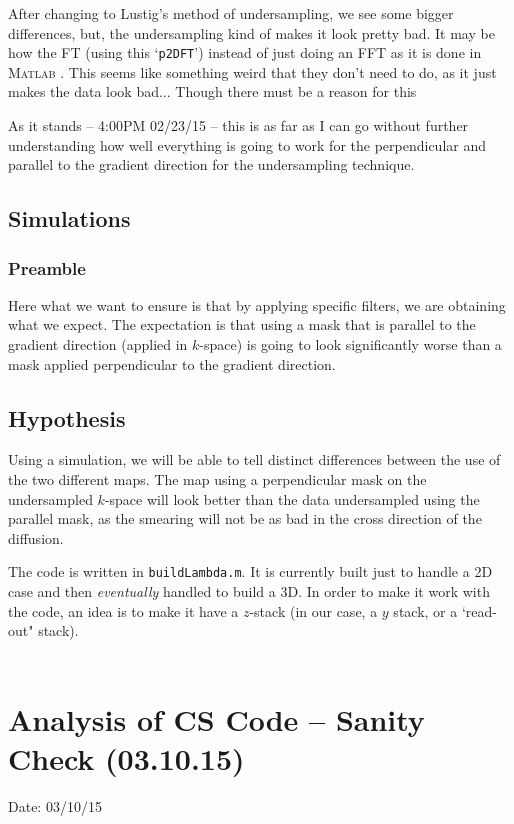 \documentclass[11 pt]{article}
\newcommand{\matlab}{\textsc{Matlab }}
\let\oldsection\section
\renewcommand\section{\clearpage\newpage\oldsection}
\begin{document}
        After changing to Lustig's method of undersampling, we see some bigger differences, but, the undersampling kind of makes it look pretty bad. It may be how the FT (using this `\verb!p2DFT!') instead of just doing an FFT as it is done in \matlab. This seems like something weird that they don't need to do, as it just makes the data look bad... Though there must be a reason for this

        As it stands -- 4:00PM 02/23/15 -- this is as far as I can go without further understanding how well everything is going to work for the perpendicular and parallel to the gradient direction for the undersampling technique.

    \subsection{Simulations}

      \subsubsection{Preamble}

        Here what we want to ensure is that by applying specific filters, we are obtaining what we expect. The expectation is that using a mask that is parallel to the gradient direction (applied in $k$-space) is going to look significantly worse than a mask applied perpendicular to the gradient direction.

    \subsection{Hypothesis}
      Using a simulation, we will be able to tell distinct differences between the use of the two different maps. The map using a perpendicular mask on the undersampled $k$-space will look better than the data undersampled using the parallel mask, as the smearing will not be as bad in the cross direction of the diffusion.

      The code is written in \verb!buildLambda.m!. It is currently built just to handle a 2D case and then \emph{eventually} handled to build a 3D. In order to make it work with the code, an idea is to make it have a $z$-stack (in our case, a $y$ stack, or a `read-out" stack). \\ \\ 



\section{Analysis of CS Code -- Sanity Check (03.10.15)}
  \noindent Date: 03/10/15
\end{document}

